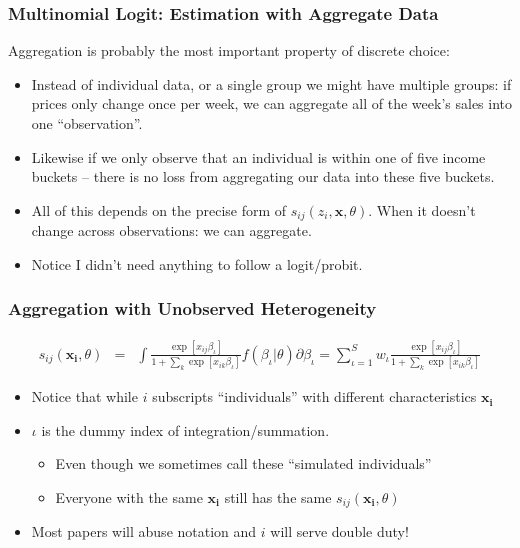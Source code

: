 \documentclass[xcolor=pdftex,dvipsnames,table,mathserif,aspectratio=169]{beamer}
\begin{document}
\begin{frame}
\frametitle{Multinomial Logit: Estimation with Aggregate Data}
\alert{Aggregation} is probably the most important property of discrete choice:
\begin{itemize}
\item Instead of individual data, or a single group we might have multiple groups: if prices only change once per week, we can aggregate all of the week's sales into one ``observation''.
\item Likewise if we only observe that an individual is within one of five income buckets -- there is no loss from aggregating our data into these five buckets.
\item All of this depends on the precise form of $ s_{ij}(z_i,\mathbf{x},\theta)$. When it doesn't change across observations: we can aggregate.
\item Notice I didn't need anything to follow a logit/probit.
\end{itemize}
\end{frame}


\begin{frame}
\frametitle{Aggregation with Unobserved Heterogeneity}
\begin{eqnarray*}
s_{ij}(\mathbf{x_{i}} , \theta) &=& \int \frac{\exp [x_{ij} \beta_{\iota}  ]}{1+\sum_k \exp[x_{ik} \beta_{\iota}]} f(\beta_{\iota} | \theta) \partial \beta_{\iota} 
= \sum_{\iota=1}^{S} w_{\iota} \frac{\exp [x_{ij} \beta_{\iota}  ]}{1+\sum_k \exp[x_{ik} \beta_{\iota}]} 
\end{eqnarray*}
\begin{itemize}
\item Notice that while $i$ subscripts ``individuals'' with different characteristics $\mathbf{x_i}$
\item $\iota$ is the dummy index of integration/summation. 
\begin{itemize}
\item Even though we sometimes call these ``simulated individuals''
\item Everyone with the same $\mathbf{x_i}$ still has the same $s_{ij}(\mathbf{x_{i}} , \theta)$
\end{itemize}
\item Most papers will abuse notation and $i$ will serve double duty!
\end{itemize}
\end{frame}
\end{document}
